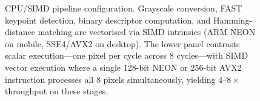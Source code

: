 \begin{figure}[htbp]
{%
}
\caption{CPU/SIMD pipeline configuration. Grayscale conversion, FAST keypoint
detection, binary descriptor computation, and Hamming-distance matching are
vectorised via SIMD intrinsics (ARM NEON on mobile, SSE4/AVX2 on desktop).
The lower panel contrasts scalar execution---one pixel per cycle across 8
cycles---with SIMD vector execution where a single 128-bit NEON or 256-bit
AVX2 instruction processes all 8 pixels simultaneously, yielding
$4$--$8\times$ throughput on these stages.}
\label{fig:cpu}
\end{figure}